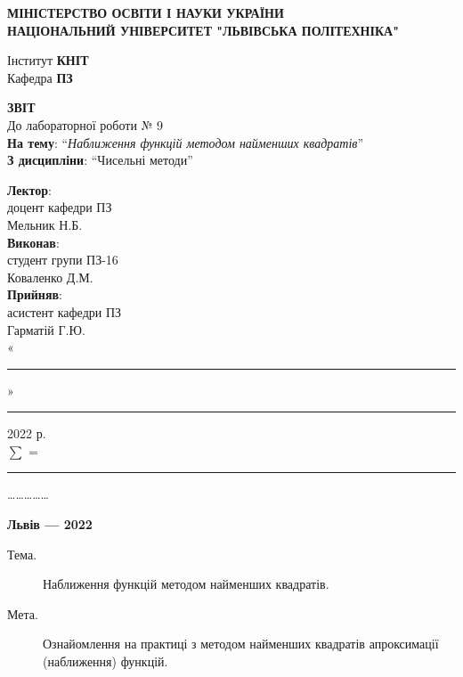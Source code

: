 \documentclass{article}
\newcommand\subject{Чисельні методи}
\newcommand\lecturer{доцент кафедри ПЗ\\Мельник Н.Б.}
\newcommand\teacher{асистент кафедри ПЗ\\Гарматій Г.Ю.}
\newcommand\mygroup{ПЗ-16}
\newcommand\lab{9}
\newcommand\theme{Наближення функцій методом найменших квадратів}
\newcommand\purpose{Ознайомлення на практиці з методом найменших квадратів
	апроксимації (наближення) функцій}
\begin{document}
	\begin{large}
		\begin{titlepage}
			\thispagestyle{empty}
			\begin{center}
				\textbf{МІНІСТЕРСТВО ОСВІТИ І НАУКИ УКРАЇНИ\\
					НАЦІОНАЛЬНИЙ УНІВЕРСИТЕТ "ЛЬВІВСЬКА ПОЛІТЕХНІКА"}
			\end{center}
			\begin{flushright}
				Інститут \textbf{КНІТ}\\
				Кафедра \textbf{ПЗ}
			\end{flushright}
			\vspace{200pt}
			\begin{center}
				\textbf{ЗВІТ}\\
				\vspace{10pt}
				До лабораторної роботи № \lab\\
				\textbf{На тему}: “\textit{\theme}”\\
				\textbf{З дисципліни}: “\subject”
			\end{center}
			\vspace{90pt}
			\begin{flushright}
				
				\textbf{Лектор}:\\
				\lecturer\\
				\vspace{28pt}
				\textbf{Виконав}:\\
				
				студент групи \mygroup\\
				Коваленко Д.М.\\
				\vspace{28pt}
				\textbf{Прийняв}:\\
				
				\teacher\\
				
				\vspace{28pt}
				«\rule{1cm}{0.15mm}» \rule{1.5cm}{0.15mm} 2022 р.\\
				$\sum$ = \rule{1cm}{0.15mm}……………\\
				
			\end{flushright}
			\vspace{\fill}
			\begin{center}
				\textbf{Львів — 2022}
			\end{center}
		\end{titlepage}
		
		\begin{description}
			\item[Тема.] \theme.
			\item[Мета.] \purpose.
		\end{description}
		

\end{large}
\end{document}
